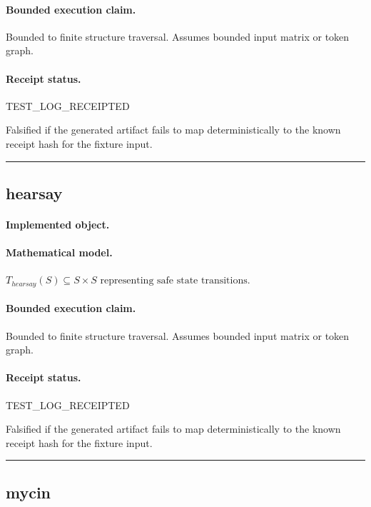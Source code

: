 \paragraph{Bounded execution claim.} Bounded to finite structure traversal. Assumes bounded input matrix or token graph.
\paragraph{Receipt status.} TEST\_LOG\_RECEIPTED
\begin{falsifier}
Falsified if the generated artifact fails to map deterministically to the known receipt hash for the fixture input.
\end{falsifier}

\vspace{1em}\hrule\vspace{1em}
\subsection{hearsay}
\paragraph{Implemented object.} 
\paragraph{Mathematical model.} $T_{hearsay}(S) \subseteq S \times S \text{ representing safe state transitions}.$
\paragraph{Bounded execution claim.} Bounded to finite structure traversal. Assumes bounded input matrix or token graph.
\paragraph{Receipt status.} TEST\_LOG\_RECEIPTED
\begin{falsifier}
Falsified if the generated artifact fails to map deterministically to the known receipt hash for the fixture input.
\end{falsifier}

\vspace{1em}\hrule\vspace{1em}
\subsection{mycin}
